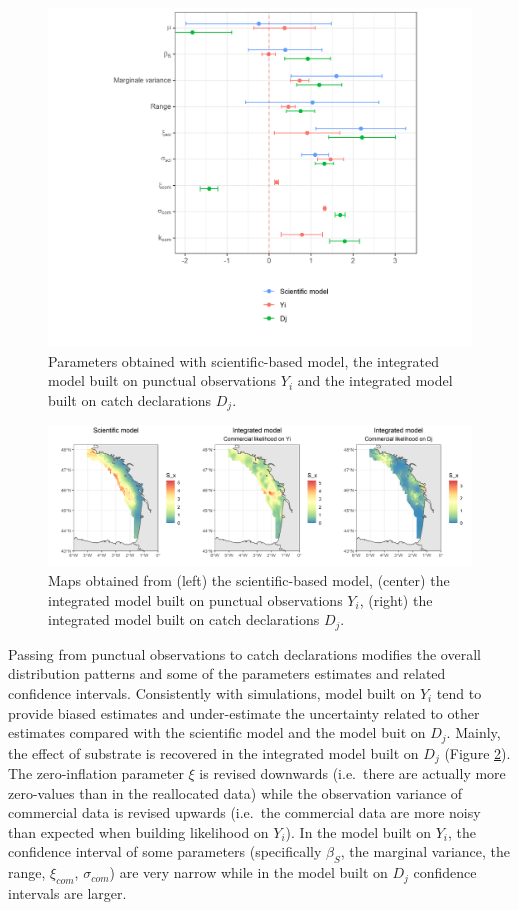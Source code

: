 \documentclass[
  english,
  man]{apa6}
\begin{document}
\begin{figure}
\centering
\includegraphics{images/par_plot.png}
\caption{\label{fig:CaseStudyPar} Parameters obtained with scientific-based model, the integrated model built on punctual observations \(Y_i\) and the integrated model built on catch declarations \(D_j\).}
\end{figure}

\begin{figure}
\centering
\includegraphics{images/case_study_plot.png}
\caption{\label{fig:CaseStudyMap} Maps obtained from (left) the scientific-based model, (center) the integrated model built on punctual observations \(Y_i\), (right) the integrated model built on catch declarations \(D_j\).}
\end{figure}

Passing from punctual observations to catch declarations modifies the overall distribution patterns and some of the parameters estimates and related confidence intervals. Consistently with simulations, model built on \(Y_i\) tend to provide biased estimates and under-estimate the uncertainty related to other estimates compared with the scientific model and the model buit on \(D_j\). Mainly, the effect of substrate is recovered in the integrated model built on \(D_j\) (Figure \ref{fig:CaseStudyMap}). The zero-inflation parameter \(\xi\) is revised downwards (i.e.~there are actually more zero-values than in the reallocated data) while the observation variance of commercial data is revised upwards (i.e.~the commercial data are more noisy than expected when building likelihood on \(Y_i\)). In the model built on \(Y_i\), the confidence interval of some parameters (specifically \(\beta_S\), the marginal variance, the range, \(\xi_{com}\), \(\sigma_{com}\)) are very narrow while in the model built on \(D_j\) confidence intervals are larger.
\end{document}
